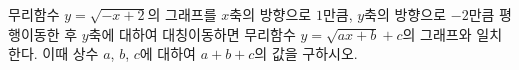 무리함수 $y=\sqrt{-x+2}$의 그래프를 $x$축의 방향으로 $1$만큼, $y$축의 방향으로 $-2$만큼 평행이동한 후 $y$축에 대하여 대칭이동하면 무리함수 $y=\sqrt{ax+b}+c$의 그래프와 일치한다. 이때 상수 $a$, $b$, $c$에 대하여 $a+b+c$의 값을 구하시오.
